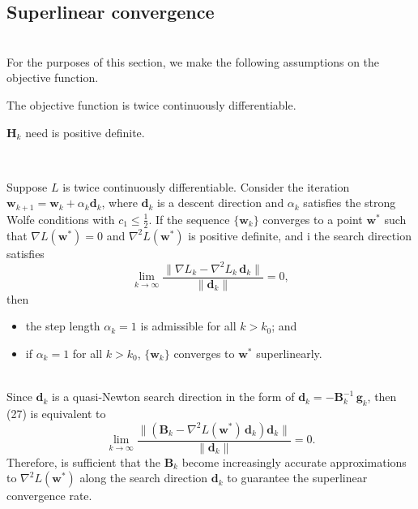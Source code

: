 \subsection{Superlinear convergence}\label{global_convergence_qn}
\\
For the purposes of this section, we make the following assumptions on the objective function.
\begin{assumption}
\label{as:3}
The objective function is twice continuously differentiable. 
\end{assumption}
\begin{assumption}
\label{as:4}
$\mathbf{H}_k$ need is positive definite.
\end{assumption}
\\

\begin{theorem}
\label{th:superlinearl_qn}
Suppose $L$ is twice continuously differentiable. Consider the iteration $\mathbf{w}_{k+1}=\mathbf{w}_k + \alpha_k \mathbf{d}_k$, where $\mathbf{d}_k$ is a descent direction and $\alpha_k$ satisfies the strong Wolfe conditions with $c_1 \leq \frac{1}{2}$. If the sequence $\{ \mathbf{w}_k\}$ converges to a point $\mathbf{w^*}$ such that $\nabla L (\mathbf{w}^*) = 0$ and $\nabla^2 L(\mathbf{w}^*)$ is positive definite, and i the search direction satisfies
\begin{equation}
      \lim_{k\to\infty} \frac{\| \nabla L_k - \nabla^2 L_k \, \mathbf{d}_k\|}{\| \mathbf{d}_k\|} = 0,
\end{equation}
then
\begin{itemize}
    \item the step length $\alpha_k = 1$ is admissible for all $k>k_0$; and
    \item if $\alpha_k = 1$ for all $k>k_0$, $\{ \mathbf{w}_k\}$ converges to $\mathbf{w}^*$ superlinearly. 
\end{itemize}
\end{theorem}
\\
Since $\mathbf{d}_k$ is a quasi-Newton search direction in the form of $\mathbf{d}_k = - \mathbf{B}_k^{-1} \, \mathbf{g}_k$, then (27) is equivalent to
\begin{equation}
      \lim_{k\to\infty} \frac{\| (\mathbf{B}_k - \nabla^2 L(\mathbf{w}^*) \, \mathbf{d}_k) \mathbf{d}_k\|}{\| \mathbf{d}_k\|} = 0.
\end{equation}
Therefore, is sufficient that the $\mathbf{B}_k$ become increasingly accurate approximations to $\nabla^2 L(\mathbf{w}^*)$ along the search direction $\mathbf{d}_k$ to guarantee the superlinear convergence rate.

